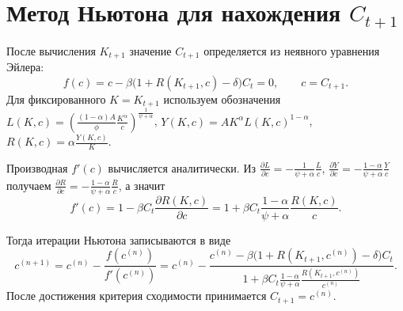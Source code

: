 \documentclass[12pt,a4paper]{report}   %
\begin{document}
        \section{Метод Ньютона для нахождения \texorpdfstring{$C_{t+1}$}{C(t+1)}}

            После вычисления \(K_{t+1}\) значение \(C_{t+1}\) определяется из неявного уравнения Эйлера:
            \[
            f(c)=c-\beta\bigl(1+R(K_{t+1},c)-\delta\bigr)C_t=0,\qquad c=C_{t+1}.
            \]
            Для фиксированного \(K=K_{t+1}\) используем обозначения
            \(L(K,c)=\left(\frac{(1-\alpha)A}{\phi}\frac{K^\alpha}{c}\right)^{\frac{1}{\psi+\alpha}}\),
            \(Y(K,c)=A K^\alpha L(K,c)^{1-\alpha}\),
            \(R(K,c)=\alpha\frac{Y(K,c)}{K}\).

            Производная \(f'(c)\) вычисляется аналитически. Из
            \(\frac{\partial L}{\partial c}=-\frac{1}{\psi+\alpha}\frac{L}{c}\),
            \(\frac{\partial Y}{\partial c}=-\frac{1-\alpha}{\psi+\alpha}\frac{Y}{c}\)
            получаем
            \(\frac{\partial R}{\partial c}=-\frac{1-\alpha}{\psi+\alpha}\frac{R}{c}\), а значит
            \[
            f'(c)=1-\beta C_t\frac{\partial R(K,c)}{\partial c}
            =1+\beta C_t\frac{1-\alpha}{\psi+\alpha}\frac{R(K,c)}{c}.
            \]

            Тогда итерации Ньютона записываются в виде
            \[
            c^{(n+1)}=
            c^{(n)}-\frac{f(c^{(n)})}{f'(c^{(n)})}
            =
            c^{(n)}-
            \frac{c^{(n)}-\beta\bigl(1+R(K_{t+1},c^{(n)})-\delta\bigr)C_t}
            {1+\beta C_t \frac{1-\alpha}{\psi+\alpha}\frac{R(K_{t+1},c^{(n)})}{c^{(n)}}}.
            \]
            После достижения критерия сходимости принимается \(C_{t+1}=c^{(n)}\).
        
\end{document}
